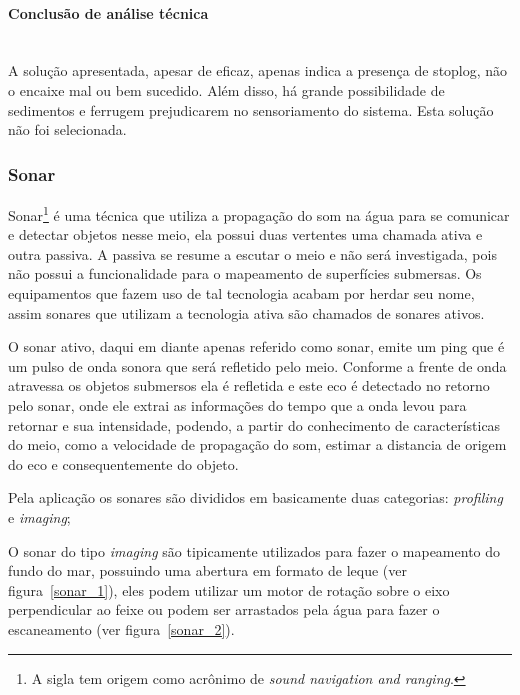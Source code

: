  \paragraph{Conclusão de análise técnica}\mbox{}\\
 A solução apresentada, apesar de eficaz, apenas indica a presença de stoplog, não o encaixe mal ou bem sucedido. Além disso, há grande possibilidade de sedimentos e ferrugem prejudicarem no sensoriamento do sistema. Esta solução não foi selecionada.

\subsubsection{Sonar}
Sonar\footnote{A sigla tem origem como acrônimo de \textit{sound navigation and ranging}.} é uma técnica que utiliza a propagação do som na água para se comunicar e detectar objetos nesse meio, ela possui duas vertentes uma chamada ativa e outra passiva. A passiva se resume a escutar o meio e não será investigada, pois não possui a funcionalidade para o mapeamento de superfícies submersas. Os equipamentos que fazem uso de tal tecnologia acabam por herdar seu nome, assim sonares que utilizam a tecnologia ativa são chamados de sonares ativos.

O sonar ativo, daqui em diante apenas referido como sonar, emite um ping que é um pulso de onda sonora que será refletido pelo meio. Conforme a frente de onda atravessa os objetos submersos ela é refletida e este eco é detectado no retorno pelo sonar, onde ele extrai as informações do tempo que a onda levou para retornar e sua intensidade, podendo, a partir do conhecimento de características do meio, como a velocidade de propagação do som, estimar a distancia de origem do eco e consequentemente do objeto.

Pela aplicação os sonares são divididos em basicamente duas categorias: \emph{profiling} e \emph{imaging};

O sonar do tipo \emph{imaging} são tipicamente utilizados para fazer o mapeamento do fundo do mar, possuindo uma abertura em formato de leque (ver figura~\ref{sonar_1}), eles podem utilizar um motor de rotação sobre o eixo perpendicular ao feixe ou podem ser arrastados pela água para fazer o escaneamento (ver figura~\ref{sonar_2}).

